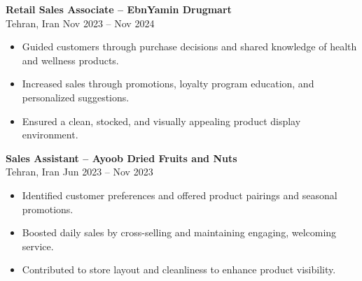\documentclass[letterpaper,11pt]{article}
\begin{document}
\textbf{Retail Sales Associate – EbnYamin Drugmart}\\
Tehran, Iran \hfill Nov 2023 -- Nov 2024
\begin{itemize}[leftmargin=*]
  \item Guided customers through purchase decisions and shared knowledge of health and wellness products.
  \item Increased sales through promotions, loyalty program education, and personalized suggestions.
  \item Ensured a clean, stocked, and visually appealing product display environment.
\end{itemize}

\textbf{Sales Assistant – Ayoob Dried Fruits and Nuts}\\
Tehran, Iran \hfill Jun 2023 -- Nov 2023
\begin{itemize}[leftmargin=*]
  \item Identified customer preferences and offered product pairings and seasonal promotions.
  \item Boosted daily sales by cross-selling and maintaining engaging, welcoming service.
  \item Contributed to store layout and cleanliness to enhance product visibility.
\end{itemize}
\end{document}
